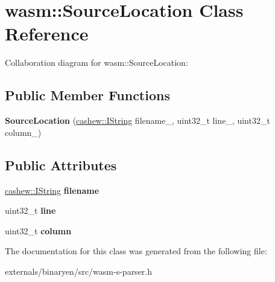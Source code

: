\hypertarget{classwasm_1_1_source_location}{}\section{wasm\+:\+:Source\+Location Class Reference}
\label{classwasm_1_1_source_location}


Collaboration diagram for wasm\+:\+:Source\+Location\+:
\subsection*{Public Member Functions}
\begin{DoxyCompactItemize}
\item 
\mbox{\label{classwasm_1_1_source_location_ab97230b88a1be17c8d28978d18876be8}} 
{\bfseries Source\+Location} (\mbox{\hyperlink{structcashew_1_1_i_string}{cashew\+::\+I\+String}} filename\+\_\+, uint32\+\_\+t line\+\_\+, uint32\+\_\+t column\+\_)
\end{DoxyCompactItemize}
\subsection*{Public Attributes}
\begin{DoxyCompactItemize}
\item 
\mbox{\label{classwasm_1_1_source_location_aa5922156272e9823bb02c6f2ae2d1913}} 
\mbox{\hyperlink{structcashew_1_1_i_string}{cashew\+::\+I\+String}} {\bfseries filename}
\item 
\mbox{\label{classwasm_1_1_source_location_affb4d7fa458e08aa1d3d385568a10252}} 
uint32\+\_\+t {\bfseries line}
\item 
\mbox{\label{classwasm_1_1_source_location_a94cb2987985493f07da0b1dc5de8e5ef}} 
uint32\+\_\+t {\bfseries column}
\end{DoxyCompactItemize}


The documentation for this class was generated from the following file\+:\begin{DoxyCompactItemize}
\item 
externals/binaryen/src/wasm-\/s-\/parser.\+h\end{DoxyCompactItemize}
